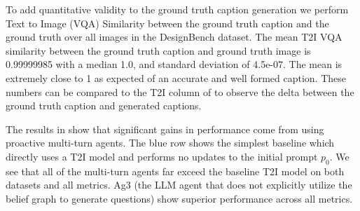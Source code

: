 To add quantitative validity to the ground truth caption generation we perform Text to Image (VQA) Similarity between the ground truth caption and the ground truth over all images in the DesignBench dataset. The mean T2I VQA similarity between the ground truth caption and ground truth image is 0.99999985 with a median 1.0, and standard deviation of 4.5e-07. The mean is extremely close to 1 as expected of an accurate and well formed caption. These numbers can be compared to the T2I column of  to observe the delta between the ground truth caption and generated captions.



The results in  show that significant gains in performance come from using proactive multi-turn agents. The blue row shows the simplest baseline which directly uses a T2I model and performs no updates to the initial prompt $p_0$. We see that all of the multi-turn agents far exceed the baseline T2I model on both datasets and all metrics. Ag3 (the LLM agent that does not explicitly utilize the belief graph to generate questions) show superior performance across all metrics.



